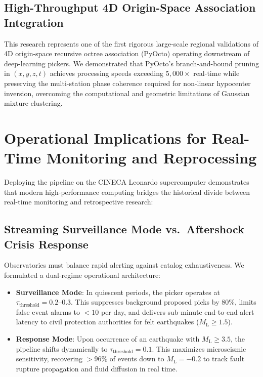 \subsection{High-Throughput 4D Origin-Space Association Integration}
This research represents one of the first rigorous large-scale regional validations of 4D origin-space recursive octree association (\ac{PyOcto}) operating downstream of deep-learning pickers. We demonstrated that PyOcto's branch-and-bound pruning in $(x, y, z, t)$ achieves processing speeds exceeding $5{,}000\times$ real-time while preserving the multi-station phase coherence required for non-linear hypocenter inversion, overcoming the computational and geometric limitations of Gaussian mixture clustering.

\section{Operational Implications for Real-Time Monitoring and Reprocessing}
\label{sec:conclusion_operations}

Deploying the pipeline on the CINECA Leonardo supercomputer demonstrates that modern high-performance computing bridges the historical divide between real-time monitoring and retrospective research:

\subsection{Streaming Surveillance Mode vs.\ Aftershock Crisis Response}
Observatories must balance rapid alerting against catalog exhaustiveness. We formulated a dual-regime operational architecture:
\begin{itemize}
  \item \textbf{Surveillance Mode}: In quiescent periods, the picker operates at $\tau_{\mathrm{threshold}} = 0.2\text{--}0.3$. This suppresses background proposed picks by $80\%$, limits false event alarms to $< 10$ per day, and delivers sub-minute end-to-end alert latency to civil protection authorities for felt earthquakes ($M_{\mathrm{L}} \ge 1.5$).
  \item \textbf{Response Mode}: Upon occurrence of an earthquake with $M_{\mathrm{L}} \ge 3.5$, the pipeline shifts dynamically to $\tau_{\mathrm{threshold}} = 0.1$. This maximizes microseismic sensitivity, recovering $> 96\%$ of events down to $M_{\mathrm{L}} = -0.2$ to track fault rupture propagation and fluid diffusion in real time.
\end{itemize}

